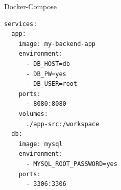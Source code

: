 \documentclass{beamer}
\begin{document}
\begin{frame}[fragile]{Docker-Compose}
  \begin{lstlisting}[language=docker-compose-2,basicstyle=\scriptsize,caption={Exemplary docker-compose.yml file},breaklines=true,label={code::compose_example}]
services:
  app:
    image: my-backend-app
    environment:
      - DB_HOST=db
      - DB_PW=yes
      - DB_USER=root
    ports:
      - 8080:8080
    volumes:
      ./app-src:/workspace
  db:
    image: mysql
    environment:
      - MYSQL_ROOT_PASSWORD=yes
    ports:
      - 3306:3306
    \end{lstlisting}
\end{frame}


\end{document}
